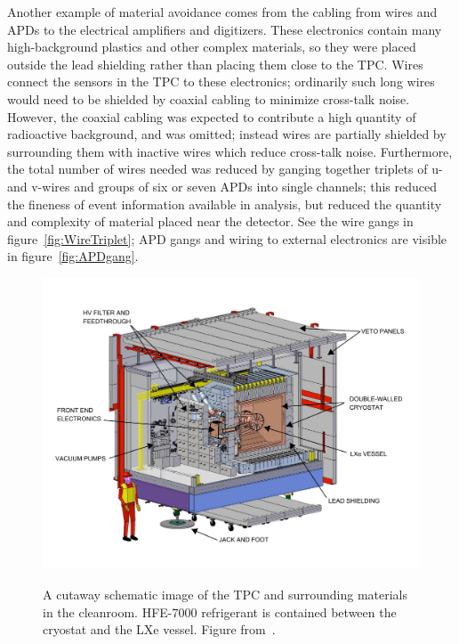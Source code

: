 Another example of material avoidance comes from the cabling from wires and APDs to the electrical amplifiers and digitizers.  These electronics contain many high-background plastics and other complex materials, so they were placed outside the lead shielding rather than placing them close to the TPC.  Wires connect the sensors in the TPC to these electronics; ordinarily such long wires would need to be shielded by coaxial cabling to minimize cross-talk noise.  However, the coaxial cabling was expected to contribute a high quantity of radioactive background, and was omitted; instead wires are partially shielded by surrounding them with inactive wires which reduce cross-talk noise.  Furthermore, the total number of wires needed was reduced by ganging together triplets of u- and v-wires and groups of six or seven APDs into single channels; this reduced the fineness of event information available in analysis, but reduced the quantity and complexity of material placed near the detector.  See the wire gangs in figure~\ref{fig:WireTriplet}; APD gangs and wiring to external electronics are visible in figure~\ref{fig:APDgang}.~\cite{detectorPartI}

\begin{figure}
\begin{center}
\includegraphics[keepaspectratio=true,width=\textwidth]{cleanroom.pdf}
\end{center}
\renewcommand{\baselinestretch}{1}
\small\normalsize
\begin{quote}
\caption{A cutaway schematic image of the TPC and surrounding materials in the cleanroom.  HFE-7000 refrigerant is contained between the cryostat and the LXe vessel.  Figure from~\cite{detectorPartI}.}
\label{fig:CleanRoomCutaway}
\end{quote}
\end{figure}
\renewcommand{\baselinestretch}{2}
\small\normalsize

